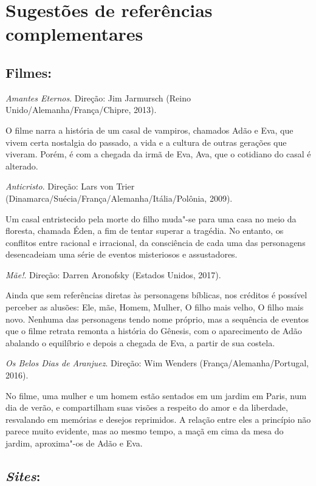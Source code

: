 \documentclass[12pt]{extarticle}
\begin{document}
\section{Sugestões de referências complementares}\label{sugestoes}

\subsection{Filmes:}

\textit{Amantes Eternos}. Direção: Jim Jarmursch (Reino Unido/Alemanha/França/Chipre, 2013).

O filme narra a história de um casal de vampiros, chamados Adão e Eva, que vivem certa nostalgia 
do passado, a vida e a cultura de outras gerações que viveram. Porém, é com a chegada da irmã de Eva, Ava, 
que o cotidiano do casal é alterado.

\textit{Anticristo}. Direção: Lars von Trier (Dinamarca/Suécia/França/Alemanha/Itália/Polônia, 2009). 

Um casal entristecido pela morte do filho muda"-se para uma casa no meio da floresta, chamada Éden, 
a fim de tentar superar a tragédia. No entanto, os conflitos entre racional e irracional, da consciência 
de cada uma das personagens desencadeiam uma série de eventos misteriosos e assustadores.

\textit{Mãe!}. Direção: Darren Aronofsky (Estados Unidos, 2017).

Ainda que sem referências diretas às personagens bíblicas, nos créditos é possível perceber as alusões: 
Ele, mãe, Homem, Mulher, O filho mais velho, O filho mais novo. Nenhuma das personagens tendo nome próprio, 
mas a sequência de eventos que o filme retrata remonta a história do Gênesis, com o aparecimento de Adão 
abalando o equilíbrio e depois a chegada de Eva, a partir de sua costela.

\textit{Os Belos Dias de Aranjuez}. Direção: Wim Wenders (França/Alemanha/Portugal, 2016).

No filme, uma mulher e um homem estão sentados em um jardim em Paris, num dia de verão, e 
compartilham suas visões a respeito do amor e da liberdade, resvalando em memórias e desejos 
reprimidos. A relação entre eles a princípio não parece muito evidente, mas ao mesmo tempo, 
a maçã em cima da mesa do jardim, aproxima"-os de Adão e Eva.

\subsection{\emph{Sites}:}
\end{document}
